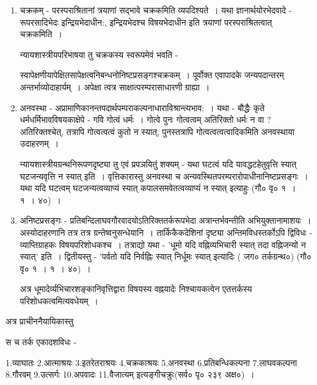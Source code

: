 {\begin{enumerate}
न्यायशास्त्रीयपरिभाषया तु अन्योन्याश्रयस्य स्वरूपमेवं भवति - 

स्वापेक्षापेक्षितत्वनिबन्धनोऽनिष्टप्रसङ्गोऽन्योन्याश्रयः~। अस्योदाहरणम् - 'यथा अयं घटो यद्येतद्धटज्ञानजन्यज्ञानविषयः स्यात् एतद्धटभिन्नः स्यात् इति~। अत्रापि उत्पत्तौ स्थितौ च उपर्युक्तरीत्या द्वैविध्यं स्वयमुदाहार्यम्~। 
\item	चक्रकम् - परस्पराश्रितानां त्रयाणां सद्भावे चक्रकमिति व्यपदिश्यते~। यथा  ज्ञानार्थयोरभेदवादे - रूपरसादिभेदः इन्द्रियभेदाधीन:, इन्द्रियभेदश्च विषयभेदाधीन इति त्रयाणां परस्पराश्रितत्वात् चक्रकमिति~। 

न्यायशास्त्रीयपरिभाषया तु चक्रकस्य स्वरूपमेवं भवति -  

स्वापेक्षणीयापेक्षितसापेक्षत्वनिबन्धनोनिष्टप्रसङ्गश्चक्रकम्~। पूर्वोक्त एवापादके जन्यपदान्तरम् अन्तर्भाव्योदाहार्यम्~। अपेक्षा त्वत्र साक्षात्परम्परासाधारणी ग्राह्या~। 
\item	अनवस्था - अप्रामाणिकानन्तपदार्थपम्पराकल्पनाधाराविश्रान्त्यभाव:~। यथा - बौद्धैः  कृते धर्मधर्मिभावविषयकाक्षेपे - गवि गोत्वं धर्मः~। गोत्वे पुनः गोत्वत्वम् अतिरिक्तो धर्मः न वा ? अतिरिक्तश्चेत्, तत्रापि गोत्वत्वत्वं कुतो न स्यात्, पुनस्तत्रापि गोत्वत्वत्वत्वादिकमिति अनवस्थाया उदाहरणम्~। 

न्यायशास्त्रीयग्रन्थनिरूपणदृष्ट्या तु एवं प्रपञयितुं शक्यम् - यथा घटत्वं यदि यावद्धटहेतुवृत्ति स्यात् घटजन्यवृत्ति न स्यात् इति~। वृत्तिकारास्तु अनवस्था च अन्यवस्थितपरम्परारोपाधीनानिष्टप्रसङ्गः~। यथा यदि घटत्वम् घटजन्यत्वव्याप्यं स्यात् कपालसमवेतत्वव्याप्यं न स्यात् इत्याहुः (गौ० वृ० १~। १~। ४०)~। 
\item	अनिष्टप्रसङ्गः - प्रतिबन्दिलाघवगौरवादयोऽतिरिक्ततर्करूपभेदा अत्रान्तर्भवन्तीति  \-अभियुक्तानामाशयः~। अस्योदाहरणानि तत्र तत्र ग्रन्तेष्वनुसन्धेयानि~। तार्किकैकदेशिनां दृष्ट्या अन्तिमविधस्तर्कोऽपि द्विविधः -  व्याप्तिग्राहकः विषयपरिशोधकश्च~। तत्राद्यो यथा - 'धूमो यदि वह्निव्यभिचारी स्यात् तदा वह्निजन्यो न स्यात्' इति~। द्वितीयस्तु - 'पर्वतो यदि निर्वह्निः स्यात् निर्धूमः स्यात् इत्यादिः ( जग० तर्कग्रन्थ०) (गौ० वृ० १~। १~। ४०)~। 

अत्र धूमादेर्व्यभिचारशङ्कानिवृत्तिद्वारा विषयस्य वह्नयादेः निश्चायकत्वेन एतत्तर्कस्य परिशोधकत्वमित्यवधेयम्~। 
\end{enumerate}

अत्र प्राचीननैयायिकास्तु 

स च तर्क एकादशविधः - 

1.व्याघातः 2.आत्माश्रयः 3.इतरेतराश्रयः 4.चक्रकाश्रयः 5.अनवस्था 6.प्रतिबन्धिकल्पना  7.लाघवकल्पना 8.गौरवम् 9.उत्सर्गः 10.अपवादः 11.वैजात्यम् इत्यङ्गीचक्रुः(सर्व० पृ० २३९ अक्ष०)~। 

}
